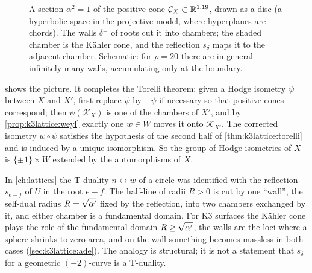 \begin{figure}[t]
\centering
{}
\caption{A section $\alpha^2=1$ of the positive cone $\mathcal C_X\subset\mathbb{R}^{1,19}$, drawn
as a disc (a hyperbolic space in the projective model, where hyperplanes are chords). The
walls $\delta^\perp$ of roots cut it into chambers; the shaded chamber is the Kähler cone,
and the reflection $s_\delta$ maps it to the adjacent chamber. Schematic: for $\rho=20$ there
are in general infinitely many walls, accumulating only at the boundary.}
\label{fig:k3lattice:chambers}
\end{figure}

 shows the picture. It completes the Torelli theorem: given a
Hodge isometry $\psi$ between $X$ and $X'$, first replace $\psi$ by $-\psi$ if necessary so
that positive cones correspond; then $\psi(\mathcal K_X)$ is one of the chambers of $X'$, and
by \cref{prop:k3lattice:weyl} exactly one $w\in W$ moves it onto $\mathcal K_{X'}$. The
corrected isometry $w\circ\psi$ satisfies the hypothesis of the second half of
\cref{thm:k3lattice:torelli} and is induced by a unique isomorphism. So the group of Hodge
isometries of $X$ is $\{\pm1\}\times W$ extended by the automorphisms of $X$.

\begin{physicsbox}
In \cref{ch:lattices} the T-duality $n\leftrightarrow w$ of a circle was identified with the
reflection $s_{e-f}$ of $U$ in the root $e-f$. The half-line of radii $R>0$ is cut by one
``wall'', the self-dual radius $R=\sqrt{\alpha'}$ fixed by the reflection, into two chambers
exchanged by it, and either chamber is a fundamental domain. For K3 surfaces the Kähler cone
plays the role of the fundamental domain $R\ge\sqrt{\alpha'}$, the walls are the loci where a
sphere shrinks to zero area, and on the wall something becomes massless in both cases
(\cref{sec:k3lattice:ade}). The analogy is structural; it is not a statement that $s_\delta$
for a geometric $(-2)$-curve is a T-duality.
\end{physicsbox}

